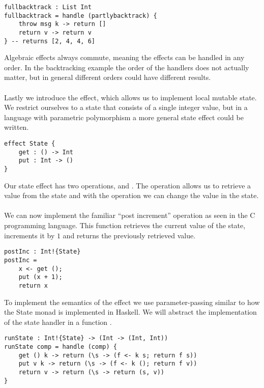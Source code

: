\begin{verbatim}
fullbacktrack : List Int
fullbacktrack = handle (partlybacktrack) {
	throw msg k -> return []
	return v -> return v
} -- returns [2, 4, 4, 6]
\end{verbatim}

Algebraic effects always commute, meaning the effects can be handled in any order.
In the backtracking example the order of the handlers does not actually matter, but in general different orders could have different results.
\\\\
Lastly we introduce the  effect, which allows us to implement local mutable state.
We restrict ourselves to a state that consists of a single integer value, but in a language with parametric polymorphism a more general state effect could be written.

\begin{verbatim}
effect State {
	get : () -> Int
	put : Int -> ()
}
\end{verbatim}

Our state effect has two operations,  and .
The  operation allows us to retrieve a value from the state and with the  operation we can change the value in the state.
\\\\
We can now implement the familiar ``post increment'' operation as seen in the C programming language.
This function retrieves the current value of the state, increments it by $1$ and returns the previously retrieved value.

\begin{verbatim}
postInc : Int!{State}
postInc =
	x <- get ();
	put (x + 1);
	return x
\end{verbatim}

To implement the semantics of the  effect we use parameter-passing similar to how the State monad is implemented in Haskell. We will abstract the implementation of the state handler in a function .

\begin{verbatim}
runState : Int!{State} -> (Int -> (Int, Int))
runState comp = handle (comp) {
	get () k -> return (\s -> (f <- k s; return f s))
	put v k -> return (\s -> (f <- k (); return f v))
	return v -> return (\s -> return (s, v))
}
\end{verbatim}

